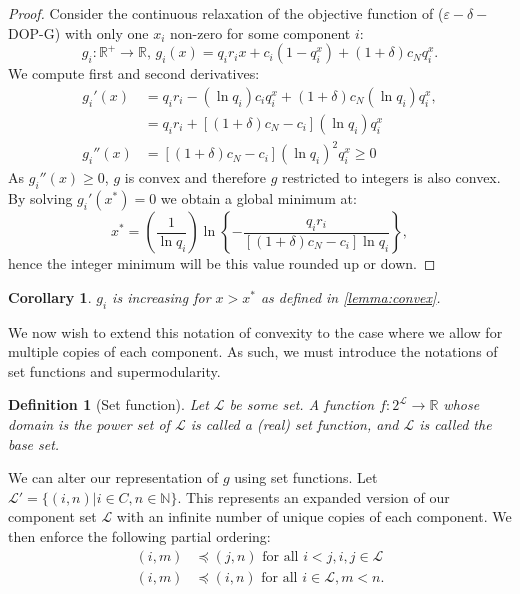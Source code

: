 \documentclass[11pt,authoryear,a4paper]{article}
\newcommand{\NN}{\mathbb{N}}
\newcommand{\RR}{\mathbb{R}}
\newtheorem{definition}{Definition}
\newtheorem{corollary}{Corollary}
\theoremstyle{definition}
\begin{document}
\begin{proof}
    Consider the continuous relaxation of the objective function of ($\varepsilon-\delta-$DOP-G) with only one $x_i$ non-zero for some component $i$:
    $$g_i:\RR^+\to\RR,\,g_i(x) = q_ir_ix + c_i(1 - q_i^x) + (1+\delta)c_Nq_i^x.$$
    We compute first and second derivatives:
    \begin{align*}
        g_i'(x) &= q_ir_i - (\ln q_i)c_iq_i^x + (1+\delta)c_N(\ln q_i)q_i^x,\\
        &= q_ir_i + \left[(1+\delta)c_N - c_i\right](\ln q_i)q_i^x\\
        g_i''(x) &= \left[(1+\delta)c_N - c_i\right](\ln q_i)^2q_i^x \geq 0
    \end{align*}
    As $g_i''(x) \geq 0$, $g$ is convex and therefore $g$ restricted to integers is also convex. By solving $g_i'(x^*) = 0$ we obtain a global minimum at:
    $$x^* = \left(\frac{1}{\ln q_i}\right)\ln\left\{-\frac{q_ir_i}{[(1+\delta)c_N - c_i]\ln q_i}\right\},$$
    hence the integer minimum will be this value rounded up or down.
\end{proof}

\begin{corollary}
    $g_i$ is increasing for $x > x^*$ as defined in \autoref{lemma:convex}.
\end{corollary}

We now wish to extend this notation of convexity to the case where we allow for multiple copies of each component. As such, we must introduce the notations of set functions and supermodularity.

\begin{definition}[Set function]
    Let $\mathcal{L}$ be some set. A function $f:2^\mathcal{L} \to \RR$ whose domain is the power set of $\mathcal{L}$ is called a (real) set function, and $\mathcal{L}$ is called the base set.
\end{definition}

We can alter our representation of $g$ using set functions. Let $\mathcal{L}' = \{(i,n) | i\in C, n\in\NN\}$. This represents an expanded version of our component set $\mathcal{L}$ with an infinite number of unique copies of each component. We then enforce the following partial ordering:
\begin{align*}
    (i,m) &\preceq (j,n) \text{ for all }i < j, i,j\in\mathcal{L}\\
    (i,m) & \preceq (i,n) \text{ for all }i\in\mathcal{L}, m < n.
\end{align*}
\end{document}
